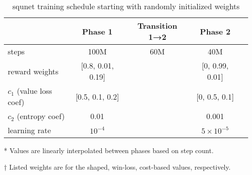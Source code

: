 \documentclass{article}
\begin{document}
\begin{table}[H]
    \centering
    \begin{threeparttable}
    \caption{squnet training schedule starting with randomly initialized weights}
    \label{tab:squnet-training-schedule}
    \begin{tabular}{lcccc}
    \toprule
     & Phase 1 & Transition 1→2\tnote{*} & Phase 2 \\
     \midrule
    steps & 100M & 60M & 40M \\
    reward weights\tnote{†} & [0.8, 0.01, 0.19] &  & [0, 0.99, 0.01] \\
    $c_1$ (value loss coef)\tnote{†} & [0.5, 0.1, 0.2] &  & [0, 0.5, 0.1]\\
    $c_2$ (entropy coef) & 0.01 & & 0.001 \\
    learning rate & $10^{-4}$ & & $5 \times 10^{-5}$ \\
    \bottomrule
    \end{tabular}
    \begin{tablenotes}
       \item[*] Values are linearly interpolated between phases based on step count.
       \item[†] Listed weights are for the shaped, win-loss, cost-based values, respectively.
    \end{tablenotes}
    \end{threeparttable}
\end{table}
\end{document}
